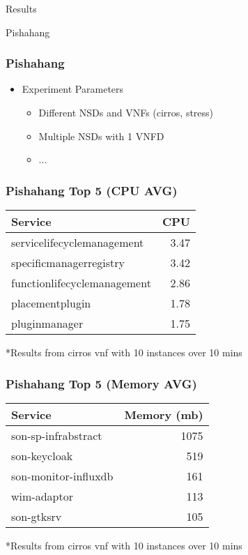\begin{frame}
\Huge{\centerline{Results}}
\Huge{\centerline{Pishahang}}
\end{frame}


\begin{frame}
\frametitle{Pishahang}
\begin{itemize}
	
	\item Experiment Parameters
	\begin{itemize}
		\item Different NSDs and VNFs (cirros, stress)
		\item Multiple NSDs with 1 VNFD
		\item ...
	\end{itemize}

	
\end{itemize}

\end{frame}

\begin{frame}
\frametitle{Pishahang Top 5 (CPU AVG)}
\begin{table}
	\begin{tabular}{l r}
		\toprule
		\textbf{Service} & \textbf{CPU} \\
		\midrule
		servicelifecyclemanagement & 3.47  \\
		specificmanagerregistry & 3.42  \\
		functionlifecyclemanagement & 2.86  \\
		placementplugin & 1.78  \\
		pluginmanager & 1.75 \\
		\bottomrule
	\end{tabular}
\end{table}
{ *Results from cirros vnf with 10 instances over 10 mins}
\end{frame}


\begin{frame}
\frametitle{Pishahang Top 5 (Memory AVG)}
\begin{table}
	\begin{tabular}{l r}
		\toprule
		\textbf{Service} & \textbf{Memory (mb)}\\
		\midrule
		son-sp-infrabstract & 1075 \\
		son-keycloak & 519 \\
		son-monitor-influxdb & 161 \\
		wim-adaptor & 113 \\
		son-gtksrv & 105 \\
		\bottomrule
	\end{tabular}
\end{table}
{ *Results from cirros vnf with 10 instances over 10 mins}
\end{frame}
